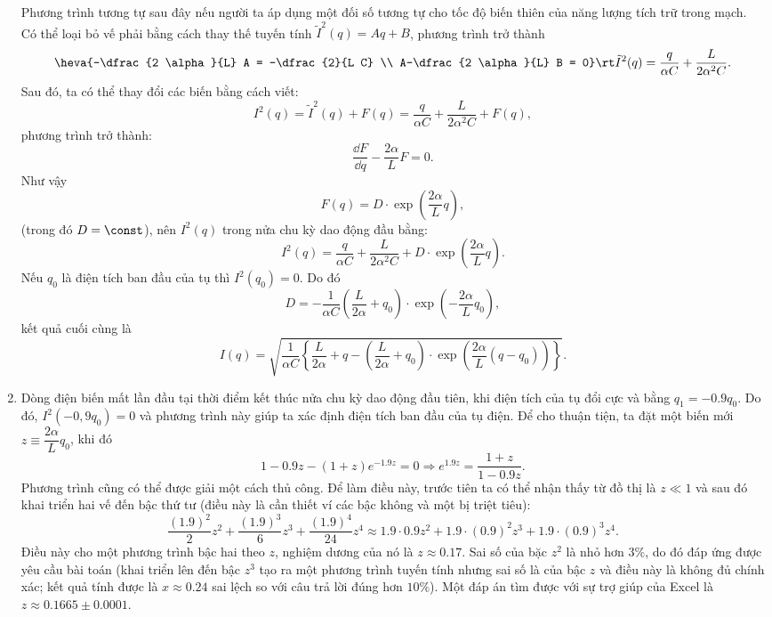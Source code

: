 \begin{loigiai}
\begin{enumerate}[1)]
    Phương trình tương tự sau đây nếu người ta áp dụng một đối số tương tự cho tốc độ biến thiên của năng lượng tích trữ trong mạch.\\
    Có thể loại bỏ vế phải bằng cách thay thế tuyến tính $\tilde{I}^{2}(q)=A q+B$, phương trình trở thành
    \[\heva{-\dfrac{2 \alpha}{L} A = -\dfrac{2}{L C} \\
    A-\dfrac{2 \alpha}{L} B = 0} \rt \tilde{I}^{2}(q)=\dfrac{q}{\alpha C}+\dfrac{L}{2 \alpha^{2} C}.\]
    Sau đó, ta có thể thay đổi các biến bằng cách viết:
    \[I^{2}(q)=\tilde{I}^{2}(q)+F(q)=\dfrac{q}{\alpha C}+\dfrac{L}{2 \alpha^{2} C}+F(q),\]
    phương trình trở thành:
    \[\dfrac{\dd F}{\dd q}-\dfrac{2 \alpha}{L} F=0.\]
    Như vậy
    \[F(q)=D \cdot \exp \left(\frac{2 \alpha}{L} q\right),\]
    (trong đó $D = \const$), nên $I^{2}(q)$  trong nửa chu kỳ dao động đầu bằng:
    \[I^{2}(q) = \dfrac{q}{\alpha C}+\dfrac{L}{2 \alpha^{2} C}+D \cdot \exp \left(\dfrac{2 \alpha}{L} q\right).\]
    Nếu $q_0$ là điện tích ban đầu của tụ thì $I^{2}\left(q_{0}\right)=0$. Do đó
    \[D = -\dfrac{1}{\alpha C}\left(\dfrac{L}{2 \alpha}+q_{0}\right) \cdot \exp \left(-\dfrac{2 \alpha}{L} q_{0}\right),\]
    kết quả cuối cùng là
    \[I(q)=\sqrt{\dfrac{1}{\alpha C}\left\{\dfrac{L}{2 \alpha}+q-\left(\dfrac{L}{2 \alpha}+q_{0}\right) \cdot \exp \left(\dfrac{2 \alpha}{L}\left(q-q_{0}\right)\right)\right\}}.\]
    \item Dòng điện biến mất lần đầu tại thời điểm kết thúc nửa chu kỳ dao động đầu tiên, khi điện tích của tụ đổi cực và bằng $q_1 = - 0.9 q_0$. Do đó, $I^{2}\left(-0,9 q_{0}\right)=0$ và phương trình này giúp ta xác định điện tích ban đầu của tụ điện. Để cho thuận tiện, ta đặt một biến mới $z \equiv \dfrac{2 \alpha}{L} q_{0}$, khi đó 
    \[1 - 0.9 z - (1+z) e^{-1.9 z}=0 \Rightarrow e^{1.9 z} = \dfrac{1+z}{1-0.9 z}.\]
    Phương trình cũng có thể được giải một cách thủ công. Để làm điều này, trước tiên ta có thể nhận thấy từ đồ thị là $z \ll 1$ và sau đó khai triển hai vế đến bậc thứ tư (điều này là cần thiết ví các bậc không và một bị triệt tiêu):
    \[\dfrac{(1.9)^{2}}{2} z^{2}+\dfrac{(1.9)^{3}}{6} z^{3}+\dfrac{(1.9)^{4}}{24} z^{4} \approx 1.9 \cdot 0.9 z^{2}+1.9 \cdot(0.9)^{2} z^{3}+1.9 \cdot(0.9)^{3} z^{4}.\]
    Điều này cho một phương trình bậc hai  theo $z$, nghiệm dương của nó là $z \approx 0.17$. Sai số của bặc $z^2$ là nhỏ hơn $3 \%$, do đó đáp ứng được yêu cầu bài toán  (khai triển lên đến bậc $z^3$ tạo ra một phương trình tuyến tính nhưng sai số là của bậc $z$ và điều này là không đủ chính xác; kết quả tính được là $x \approx 0.24$ sai lệch so với câu trả lời đúng hơn $10\%$). Một đáp án tìm được với sự trợ giúp của Excel là $z \approx 0.1665 \pm 0.0001$.\\

\end{enumerate}
\end{loigiai}
